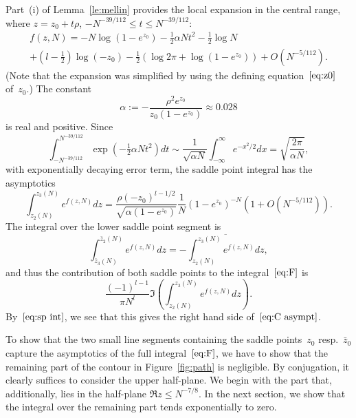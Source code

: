 \documentclass[a4paper]{amsart}
\begin{document}
Part~(i) of Lemma~\ref{le:mellin} provides the local
expansion in the central range, where $z=z_0+t\rho$,
$-N^{-39/112}\leq t \leq N^{-39/112}$:
\begin{multline}\label{eq:loc expans}
  f(z,N) = - N \log(1 -e^{z_0}) -\tfrac12 \alpha N t^2 - \tfrac12 \log N \\
     + (l-\tfrac12)\log(-z_0) -\tfrac12 (\log2\pi +\log(1-e^{z_0}))
      + O(N^{-5/112}).
\end{multline}
(Note that the expansion was simplified by using the defining equation~$\eqref{eq:z0}$
of~$z_0$.) The constant
\[
  \alpha := -\frac{\rho^2e^{z_0}} {z_0(1-e^{z_0})} \approx 0.028
\]
is real and positive. Since
\[
  \int_{-N^{-39/112}}^{N^{-39/112}}\exp(-\tfrac12 \alpha N t^2)dt
  \sim \frac{1}{\sqrt{\alpha N}}\int_{-\infty}^{\infty}e^{-x^2/2}dx
  = \sqrt{\frac{2\pi}{\alpha N}},
\]
with exponentially decaying error term,
the saddle point integral has the asymptotics
\begin{equation}\label{eq:sp int}
  \int_{z_2(N)}^{z_3(N)} e^{f(z,N)}dz =
  \frac{\rho(-z_0)^{l-1/2}}{ \sqrt{\alpha(1-e^{z_0})}}
  \frac1N (1-e^{z_0})^{-N}(1+O(N^{-5/112})).
\end{equation}
The integral over the lower saddle point segment is
\[
  \int_{\bar{z}_3(N)}^{\bar{z}_2(N)}e^{f(z,N)}dz =
    - \overline{\int_{z_2(N)}^{z_3(N)} e^{f(z,N)}dz},
\]
and thus the contribution of both saddle points to the integral~$\eqref{eq:F}$
is
\[
   \frac{(-1)^{l-1}}{\pi N^l} \Im \left(
     \int_{z_2(N)}^{z_3(N)} e^{f(z,N)}dz \right).
\]
By~$\eqref{eq:sp int}$, we see that this gives the right hand
side of~$\eqref{eq:C asympt}$.

To show that the two small line segments containing the saddle points~$z_0$
resp.~$\bar{z}_0$ capture
the asymptotics of the full integral~$\eqref{eq:F}$,
we have to show that the remaining part of the contour in Figure~\ref{fig:path}
is negligible. 
By conjugation, it clearly suffices to consider
the upper half-plane.
We begin with the part that, additionally, lies
in the half-plane $\Re z \leq N^{-7/8}$. In the next section,
we show that the integral over the remaining part tends exponentially to zero.
\end{document}
